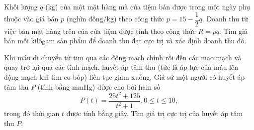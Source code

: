 \begin{bt}%
	Khối lượng $q$ (kg) của một mặt hàng mà cửa tiệm bán được trong một ngày phụ thuộc vào giá bán $p$ (nghìn đồng/kg) theo công thức $p=15-\dfrac{1}{2} q$. Doanh thu từ việc bán mặt hàng trên của cửa tiệm được tính theo công thức $R=p q$. Tìm giá bán mỗi kilôgam sản phẩm để doanh thu đạt cực trị và xác định doanh thu đó.
\end{bt}

\begin{bt}%
	Khi máu di chuyển từ tim qua các động mạch chính rồi đến các mao mạch và quay trở lại qua các tĩnh mạch, huyết áp tâm thu (tức là áp lực của máu lên động mạch khi tim co bóp) liên tục giảm xuống. Giả sử một người có huyết áp tâm thu $P$ (tính bằng mmHg) được cho bởi hàm số
	$$
	P(t)=\dfrac{25 t^2+125}{t^2+1}, 0 \leq t \leq 10,
	$$
	trong đó thời gian $t$ được tính bằng giây. Tìm giá trị cực trị của huyết áp tâm thu $P$.
\end{bt}

